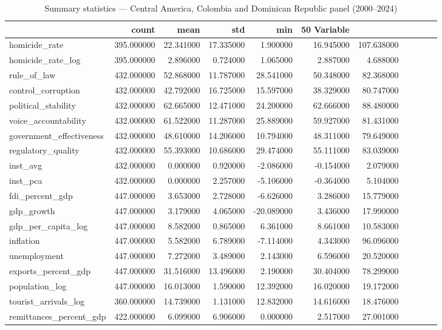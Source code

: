 \begin{table}
\caption{Summary statistics — Central America, Colombia and Dominican Republic panel (2000--2024)}
\label{tab:summary_stats}
\begin{tabular}{lrrrrrr}
\toprule
 & count & mean & std & min & 50%
Variable &  &  &  &  &  &  \\
\midrule
homicide_rate & 395.000000 & 22.341000 & 17.335000 & 1.900000 & 16.945000 & 107.638000 \\
homicide_rate_log & 395.000000 & 2.896000 & 0.724000 & 1.065000 & 2.887000 & 4.688000 \\
rule_of_law & 432.000000 & 52.868000 & 11.787000 & 28.541000 & 50.348000 & 82.368000 \\
control_corruption & 432.000000 & 42.792000 & 16.725000 & 15.597000 & 38.329000 & 80.747000 \\
political_stability & 432.000000 & 62.665000 & 12.471000 & 24.200000 & 62.666000 & 88.480000 \\
voice_accountability & 432.000000 & 61.522000 & 11.287000 & 25.889000 & 59.927000 & 81.431000 \\
government_effectiveness & 432.000000 & 48.610000 & 14.206000 & 10.794000 & 48.311000 & 79.649000 \\
regulatory_quality & 432.000000 & 55.393000 & 10.686000 & 29.474000 & 55.111000 & 83.039000 \\
inst_avg & 432.000000 & 0.000000 & 0.920000 & -2.086000 & -0.154000 & 2.079000 \\
inst_pca & 432.000000 & 0.000000 & 2.257000 & -5.106000 & -0.364000 & 5.104000 \\
fdi_percent_gdp & 447.000000 & 3.653000 & 2.728000 & -6.626000 & 3.286000 & 15.779000 \\
gdp_growth & 447.000000 & 3.179000 & 4.065000 & -20.089000 & 3.436000 & 17.990000 \\
gdp_per_capita_log & 447.000000 & 8.582000 & 0.865000 & 6.361000 & 8.661000 & 10.583000 \\
inflation & 447.000000 & 5.582000 & 6.789000 & -7.114000 & 4.343000 & 96.096000 \\
unemployment & 447.000000 & 7.272000 & 3.489000 & 2.143000 & 6.596000 & 20.520000 \\
exports_percent_gdp & 447.000000 & 31.516000 & 13.496000 & 2.190000 & 30.404000 & 78.299000 \\
population_log & 447.000000 & 16.013000 & 1.590000 & 12.392000 & 16.020000 & 19.172000 \\
tourist_arrivals_log & 360.000000 & 14.739000 & 1.131000 & 12.832000 & 14.616000 & 18.476000 \\
remittances_percent_gdp & 422.000000 & 6.099000 & 6.906000 & 0.000000 & 2.517000 & 27.001000 \\
\bottomrule
\end{tabular}
\end{table}
